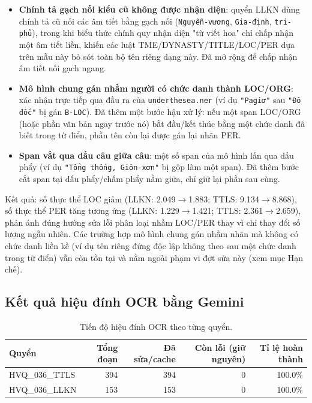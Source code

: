 \documentclass[12pt,a4paper]{article}
\begin{document}
\begin{itemize}
  \item \textbf{Chính tả gạch nối kiểu cũ không được nhận diện}: quyển LLKN
    dùng chính tả cũ nối các âm tiết bằng gạch nối (\texttt{Nguyễn-vương},
    \texttt{Gia-định}, \texttt{tri-phủ}), trong khi biểu thức chính quy nhận
    diện "từ viết hoa" chỉ chấp nhận một âm tiết liền, khiến các luật
    TME/DYNASTY/TITLE/LOC/PER dựa trên mẫu này bỏ sót toàn bộ tên riêng dạng
    này. Đã mở rộng để chấp nhận âm tiết nối gạch ngang.
  \item \textbf{Mô hình chung gán nhầm người có chức danh thành LOC/ORG}:
    xác nhận trực tiếp qua đầu ra của \texttt{underthesea.ner} (ví dụ
    \texttt{"Pagiơ"} sau \texttt{"Đô đốc"} bị gán \texttt{B-LOC}). Đã thêm một
    bước hậu xử lý: nếu một span LOC/ORG (hoặc phần văn bản ngay trước nó) bắt
    đầu/kết thúc bằng một chức danh đã biết trong từ điển, phần tên còn lại
    được gán lại nhãn PER.
  \item \textbf{Span vắt qua dấu câu giữa câu}: một số span của mô hình lấn
    qua dấu phẩy (ví dụ \texttt{"Tổng thống, Giôn-xơn"} bị gộp làm một span).
    Đã thêm bước cắt span tại dấu phẩy/chấm phẩy nằm giữa, chỉ giữ lại phần
    sau cùng.
\end{itemize}

Kết quả: số thực thể LOC giảm (LLKN: 2.049$\to$1.883; TTLS: 9.134$\to$8.868),
số thực thể PER tăng tương ứng (LLKN: 1.229$\to$1.421; TTLS:
2.361$\to$2.659), phản ánh đúng hướng sửa lỗi phân loại nhầm LOC/PER thay vì
chỉ thay đổi số lượng ngẫu nhiên. Các trường hợp mô hình chung gán nhầm nhãn
mà không có chức danh liền kề (ví dụ tên riêng đứng độc lập không theo sau
một chức danh trong từ điển) vẫn còn tồn tại và nằm ngoài phạm vi đợt sửa này
(xem mục Hạn chế).

\subsection{Kết quả hiệu đính OCR bằng Gemini}

\begin{table}[h]
\centering
\begin{tabular}{lrrrr}
\toprule
Quyển & Tổng đoạn & Đã sửa/cache & Còn lỗi (giữ nguyên) & Tỉ lệ hoàn thành \\
\midrule
HVQ\_036\_TTLS & 394 & 394 & 0 & 100.0\% \\
HVQ\_036\_LLKN & 153 & 153 & 0 & 100.0\% \\
\bottomrule
\end{tabular}
\caption{Tiến độ hiệu đính OCR theo từng quyển.}
\end{table}
\end{document}

